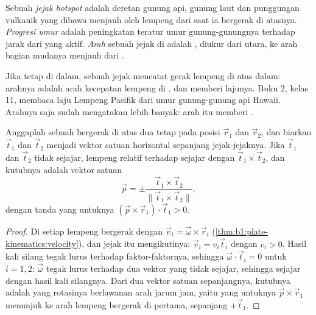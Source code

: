 \begin{definition}\label{def:b1:hotspots:track}
Sebuah \emph{jejak hotspot} adalah deretan gunung api, gunung laut dan punggungan vulkanik yang dibawa menjauh oleh lempeng dari  saat ia bergerak di atasnya. \emph{Progresi umur} adalah peningkatan teratur umur gunung-gunungnya terhadap jarak dari yang aktif. \emph{Arah} sebuah jejak di  adalah , diukur dari utara, ke arah bagian mudanya menjauh dari .
\end{definition}

Jika  tetap di  dalam, sebuah jejak mencatat gerak lempeng di atas  dalam: arahnya adalah arah kecepatan lempeng di , dan  memberi lajunya. Buku 2, kelas 11, membaca laju Lempeng Pasifik dari umur gunung-gunung api Hawaii. Arahnya saja sudah mengatakan lebih banyak: arah itu memberi .

\begin{proposition}\label{prop:b1:hotspots:two-tracks}
Anggaplah sebuah  bergerak di atas dua  tetap pada posisi $\vec r_1$ dan
$\vec r_2$, dan biarkan $\vec t_1$ dan $\vec t_2$ menjadi vektor satuan horizontal sepanjang
jejak-jejaknya. Jika $\vec t_1$ dan $\vec t_2$ tidak sejajar,  lempeng relatif
terhadap  sejajar dengan $\vec t_1\times\vec t_2$, dan kutubnya adalah vektor satuan
\[
  \vec p = \pm\frac{\vec t_1\times\vec t_2}{\lVert\vec t_1\times\vec t_2\rVert},
\]
dengan tanda yang untuknya $(\vec p\times\vec r_1)\cdot\vec t_1 > 0$.
\end{proposition}

\begin{proof}
Di setiap  lempeng bergerak dengan $\vec v_i = \vec\omega\times\vec r_i$
(\cref{thm:b1:plate-kinematics:velocity}), dan jejak itu mengikutinya:
$\vec v_i = v_i\vec t_i$ dengan $v_i > 0$. Hasil kali silang tegak lurus terhadap faktor-faktornya,
sehingga $\vec\omega\cdot\vec t_i = 0$ untuk $i = 1, 2$: $\vec\omega$ tegak lurus terhadap dua
vektor yang tidak sejajar, sehingga sejajar dengan hasil kali silangnya. Dari dua vektor
satuan sepanjangnya, kutubnya adalah yang rotasinya berlawanan arah jarum jam, yaitu yang
untuknya $\vec p\times\vec r_1$ menunjuk ke arah lempeng bergerak di  pertama,
sepanjang $+\vec t_1$.
\end{proof}

